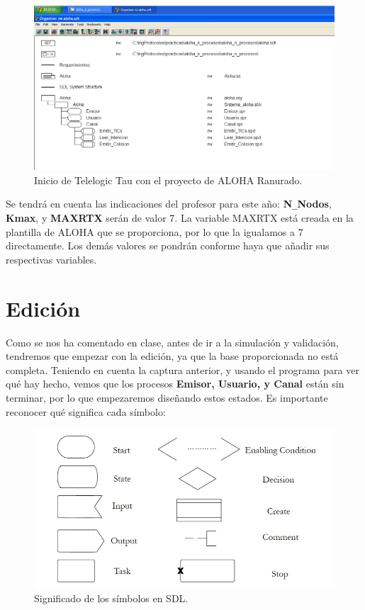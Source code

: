 \documentclass{article}
\begin{document}
\quad

\begin{figure}[h]
    \centering
    \includegraphics[width=1\linewidth]{src/Organizer-tltau.png}
    \caption{\label{fig:tltau} Inicio de Telelogic Tau con el proyecto de ALOHA Ranurado.}
\end{figure}

Se tendrá en cuenta las indicaciones del profesor para este año: \textbf{N}\verb|_|\textbf{Nodos}, \textbf{Kmax}, y \textbf{MAXRTX} serán de valor 7. La variable MAXRTX está creada en la plantilla de ALOHA que se proporciona, por lo que la igualamos a 7 directamente. Los demás valores se pondrán conforme haya que añadir sus respectivas variables.

\newpage

\section{Edición}

Como se nos ha comentado en clase, antes de ir a la simulación y validación, tendremos que empezar con la edición, ya que la base proporcionada no está completa. Teniendo en cuenta la captura anterior, y usando el programa para ver qué hay hecho, vemos que los procesos \textbf{Emisor, Usuario, y Canal} están sin terminar, por lo que empezaremos diseñando estos estados.
Es importante reconocer qué significa cada símbolo:

\begin{figure}[h]
    \centering
    \includegraphics[width=0.7\linewidth]{src/sdl-symbols.jpg}
    \caption{\label{fig:sdlsymbols} Significado de los símbolos en SDL.}
\end{figure}
\end{document}
